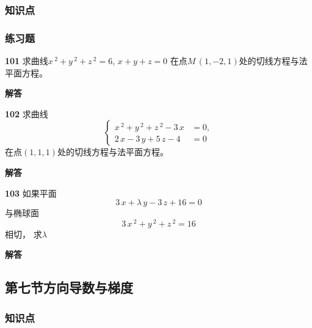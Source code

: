 \documentclass[a4paper,10pt]{article} %
\begin{document}
\subsubsection{知识点}
\subsubsection{练习题}

\par\noindent \textbf{101} \quad 求曲线$x\,^2+y\,^2+z\,^2=6$, $x+y+z=0$ 在点$M\,(1,-2,1)$处的切线方程与法平面方程。
\par\noindent \textbf{ 解答}





\textheight


\par\noindent \textbf{102} \quad 求曲线
\begin{equation*}    %
 \begin{cases}
    x\,^2+y\,^2+z\,^2-3\,x & =0,  \\
    2\,x-3\,y+5\,z-4 & =0
 \end{cases}                
\end{equation*}
在点$(1,1,1)$处的切线方程与法平面方程。
\par\noindent \textbf{ 解答}





\textheight


\par\noindent \textbf{103} \quad 如果平面
$$3\,x+\lambda \,y-3\,z+16=0$$
与椭球面
$$3\,x\,^2+y\,^2+z\,^2=16$$
相切， 求$\lambda$
\par\noindent \textbf{ 解答}





\textheight


\newpage
\subsection{第七节\quad 方向导数与梯度}
\subsubsection{知识点}
\end{document}
